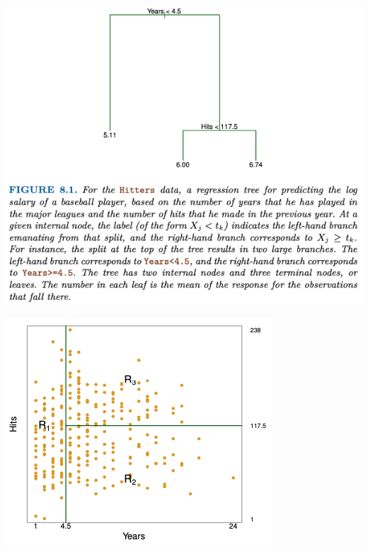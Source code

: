 \documentclass[aspectratio=169,xcolor=dvipsnames]{beamer}
\begin{document}
\begin{frame}
\centering
\includegraphics[scale = 0.45]{images/reg_tree.png}
\end{frame}

\begin{frame}
\centering
\includegraphics[scale = 0.65]{images/partition.png}
\end{frame}
\end{document}

